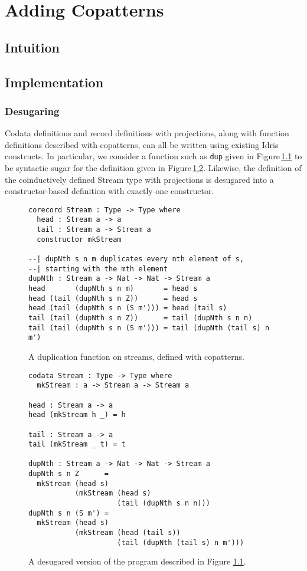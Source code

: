 \chapter{Adding Copatterns}
\label{sec:adding_copatterns}
\section{Intuition}

\section{Implementation}
\subsection{Desugaring}
Codata definitions and record definitions with projections, along with function definitions described with copatterns, can all be written using existing Idris constructs. In particular, we consider a function such as \texttt{dup} given in Figure\,\ref{fig:dup_copatterns} to be syntactic sugar for the definition given in Figure\,\ref{fig:dup_desugared}. Likewise, the definition of the coinductively defined Stream type with projections is desugared into a constructor-based definition with exactly one constructor.

\begin{figure}
\begin{lstlisting}
corecord Stream : Type -> Type where
  head : Stream a -> a
  tail : Stream a -> Stream a
  constructor mkStream

--| dupNth s n m duplicates every nth element of s, 
--| starting with the mth element
dupNth : Stream a -> Nat -> Nat -> Stream a
head       (dupNth s n m)       = head s
head (tail (dupNth s n Z))      = head s
head (tail (dupNth s n (S m'))) = head (tail s)
tail (tail (dupNth s n Z))      = tail (dupNth s n n)
tail (tail (dupNth s n (S m'))) = tail (dupNth (tail s) n m')
\end{lstlisting}
\caption{A duplication function on streams, defined with copatterns.}
\label{fig:dup_copatterns}
\end{figure}

\begin{figure}
\begin{lstlisting}
codata Stream : Type -> Type where
  mkStream : a -> Stream a -> Stream a

head : Stream a -> a
head (mkStream h _) = h

tail : Stream a -> a
tail (mkStream _ t) = t

dupNth : Stream a -> Nat -> Nat -> Stream a
dupNth s n Z      =
  mkStream (head s)
           (mkStream (head s)
                     (tail (dupNth s n n)))
dupNth s n (S m') =
  mkStream (head s)
           (mkStream (head (tail s))
                     (tail (dupNth (tail s) n m')))
\end{lstlisting}
\caption{A desugared version of the program described in Figure \ref{fig:dup_copatterns}.}
\label{fig:dup_desugared}
\end{figure}


